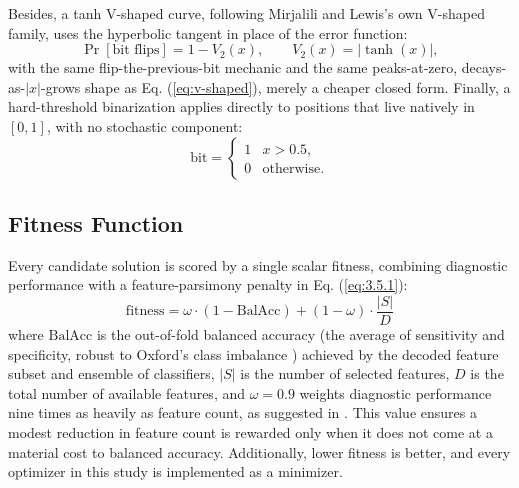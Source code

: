 Besides, a tanh V-shaped curve, following Mirjalili and Lewis's \cite{Mirjalili:2013} own V-shaped family, uses the hyperbolic tangent in place of the error function:
\begin{equation}
  \Pr[\text{bit flips}] = 1 - V_2(x), \qquad
  V_2(x) = |\tanh(x)|,
  \label{eq:v-shaped-tanh}
\end{equation}
with the same flip-the-previous-bit mechanic and the same peaks-at-zero, decays-as-$|x|$-grows shape as Eq. (\ref{eq:v-shaped}), merely a cheaper closed form. Finally, a hard-threshold binarization \cite{Hashim:2023} applies directly to positions that live natively in $[0,1]$, with no stochastic component:
\begin{equation}
  \text{bit} =
  \begin{cases}
    1 & x > 0.5, \\
    0 & \text{otherwise}.
  \end{cases}
  \label{eq:threshold}
\end{equation}

\subsection{Fitness Function} \label{sec:3.5}
Every candidate solution is scored by a single scalar fitness, combining diagnostic performance with a feature-parsimony penalty in Eq. (\ref{eq:3.5.1}):
\begin{equation}
  \text{fitness} = \omega \cdot (1 - \text{BalAcc}) + (1 - \omega) \cdot \frac{|S|}{D}
  \label{eq:3.5.1}
\end{equation}
where $\text{BalAcc}$ is the out-of-fold balanced accuracy (the average of sensitivity and specificity, robust to Oxford's class imbalance \cite{Brodersen:2010}) achieved by the decoded feature subset and ensemble of classifiers, $|S|$ is the number of selected features, $D$ is the total number of available features, and $\omega = 0.9$ weights diagnostic performance nine times as heavily as feature count, as suggested in \cite{Priyadharshini:2024}. This value ensures a modest reduction in feature count is rewarded only when it does not come at a material cost to balanced accuracy. Additionally, lower fitness is better, and every optimizer in this study is implemented as a minimizer.


